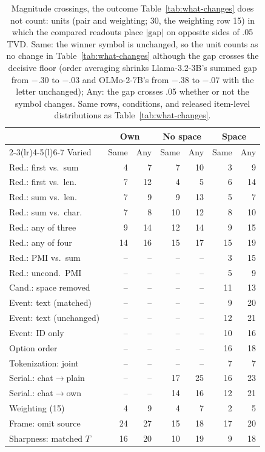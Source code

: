 \begin{table}[t]
\centering\scriptsize
\setlength{\tabcolsep}{2.2pt}
\begin{tabular}{@{}lrrrrrr@{}}
\toprule
& \multicolumn{2}{c}{Own} & \multicolumn{2}{c}{No space} & \multicolumn{2}{c}{Space} \\
\cmidrule(lr){2-3}\cmidrule(lr){4-5}\cmidrule(l){6-7}
Varied & Same & Any & Same & Any & Same & Any \\
\midrule
Red.: first vs.\ sum & 4 & 7 & 7 & 10 & 3 & 9 \\
Red.: first vs.\ len. & 7 & 12 & 4 & 5 & 6 & 14 \\
Red.: sum vs.\ len. & 7 & 9 & 9 & 13 & 5 & 7 \\
Red.: sum vs.\ char. & 7 & 8 & 10 & 12 & 8 & 10 \\
Red.: any of three & 9 & 14 & 12 & 14 & 9 & 15 \\
Red.: any of four & 14 & 16 & 15 & 17 & 15 & 19 \\
Red.: PMI vs.\ sum & -- & -- & -- & -- & 3 & 15 \\
Red.: uncond.\ PMI & -- & -- & -- & -- & 5 & 9 \\
Cand.: space removed & -- & -- & -- & -- & 11 & 13 \\
Event: text (matched) & -- & -- & -- & -- & 9 & 20 \\
Event: text (unchanged) & -- & -- & -- & -- & 12 & 21 \\
Event: ID only & -- & -- & -- & -- & 10 & 16 \\
Option order & -- & -- & -- & -- & 16 & 18 \\
Tokenization: joint & -- & -- & -- & -- & 7 & 7 \\
Serial.: chat$\to$plain & -- & -- & 17 & 25 & 16 & 23 \\
Serial.: chat$\to$own & -- & -- & 14 & 16 & 12 & 21 \\
Weighting (15) & 4 & 9 & 4 & 7 & 2 & 5 \\
Frame: omit source & 24 & 27 & 15 & 18 & 17 & 20 \\
Sharpness: matched $T$ & 16 & 20 & 10 & 19 & 9 & 18 \\
\bottomrule
\end{tabular}
\caption{Magnitude crossings, the outcome Table~\ref{tab:what-changes} does not count: units (pair and weighting; 30, the weighting row 15) in which the compared readouts place $|\text{gap}|$ on opposite sides of .05 TVD. Same: the winner symbol is unchanged, so the unit counts as no change in Table~\ref{tab:what-changes} although the gap crosses the decisive floor (order averaging shrinks Llama-3.2-3B's summed \PC{} gap from $-.30$ to $-.03$ and OLMo-2-7B's from $-.38$ to $-.07$ with the letter unchanged); Any: the gap crosses .05 whether or not the symbol changes. Same rows, conditions, and released item-level distributions as Table~\ref{tab:what-changes}.}
\label{tab:magnitude-crossing}
\end{table}
